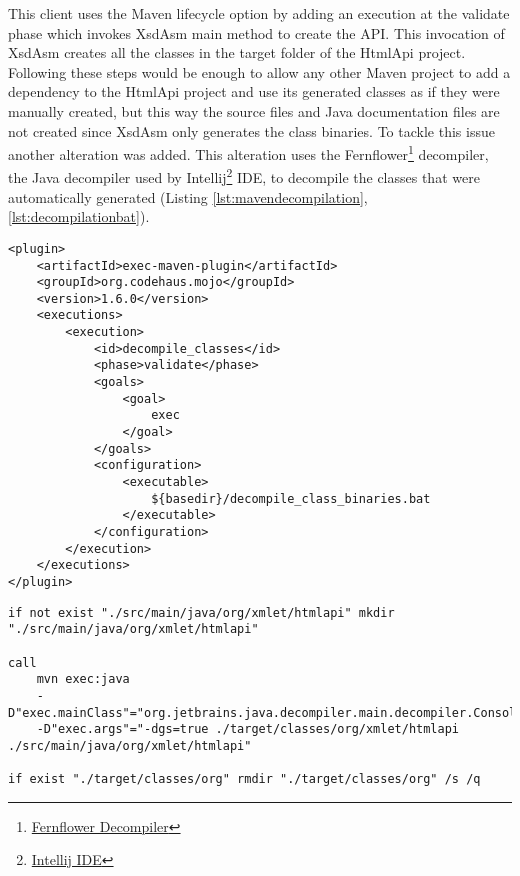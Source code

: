 \noindent
This client uses the Maven lifecycle option by adding an execution at the validate phase which invokes XsdAsm main method to create the \ac{API}. This invocation of XsdAsm creates all the classes in the target folder of the HtmlApi project. Following these steps would be enough to allow any other Maven project to add a dependency to the HtmlApi project and use its generated classes as if they were manually created, but this way the source files and Java documentation files are not created since XsdAsm only generates the class binaries. To tackle this issue another alteration was added. This alteration uses the Fernflower\footnote{\href{https://mvnrepository.com/artifact/org.jboss.windup.decompiler/decompiler-fernflower/4.0.0.Final}{Fernflower Decompiler}} decompiler, the Java decompiler used by Intellij\footnote{\href{https://www.jetbrains.com/idea/}{Intellij IDE}} \ac{IDE}, to decompile the classes that were automatically generated (Listing \ref{lst:mavendecompilation}, \ref{lst:decompilationbat}). 

\bigskip


\begin{minipage}{\linewidth}
\begin{lstlisting}[caption={Maven API decompile classes plugin},captionpos=b,label={lst:mavendecompilation}]
<plugin>
    <artifactId>exec-maven-plugin</artifactId>
    <groupId>org.codehaus.mojo</groupId>
    <version>1.6.0</version>
    <executions>
        <execution>
            <id>decompile_classes</id>
            <phase>validate</phase>
            <goals>
                <goal>
                    exec
                </goal>
            </goals>
            <configuration>
                <executable>
                    ${basedir}/decompile_class_binaries.bat
                </executable>
            </configuration>
        </execution>
    </executions>
</plugin>
\end{lstlisting}
\end{minipage}


\begin{minipage}{\linewidth}
\begin{lstlisting}[caption={Maven API decompile batch file (decompile\_class\_binaries.bat)},captionpos=b,label={lst:decompilationbat}]
if not exist "./src/main/java/org/xmlet/htmlapi" mkdir "./src/main/java/org/xmlet/htmlapi"

call 
    mvn exec:java 
    -D"exec.mainClass"="org.jetbrains.java.decompiler.main.decompiler.ConsoleDecompiler" 
    -D"exec.args"="-dgs=true ./target/classes/org/xmlet/htmlapi ./src/main/java/org/xmlet/htmlapi"

if exist "./target/classes/org" rmdir "./target/classes/org" /s /q
\end{lstlisting}
\end{minipage}

